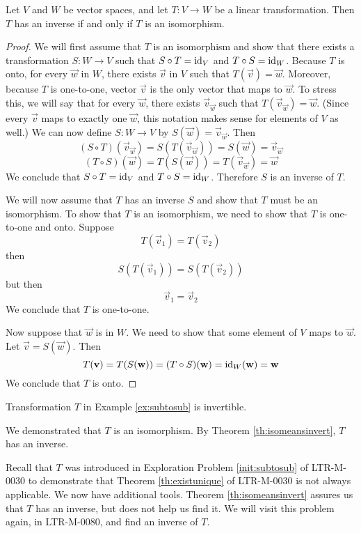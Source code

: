 \documentclass{ximera}
\begin{document}
\begin{theorem}\label{th:isomeansinvert} Let $V$ and $W$ be vector spaces, and let $T:V\rightarrow W$ be a linear transformation.  Then $T$ has an inverse if and only if $T$ is an isomorphism. 
\end{theorem}
\begin{proof}
We will first assume that $T$ is an isomorphism and show that there exists a transformation $S:W\rightarrow V$ such that $S\circ T=\text{id}_V$ and $T\circ S=\text{id}_W$.  Because $T$ is onto, for every $\vec{w}$ in $W$, there exists $\vec{v}$ in $V$ such that $T(\vec{v})=\vec{w}$.  Moreover, because $T$ is one-to-one, vector $\vec{v}$ is the only vector that maps to $\vec{w}$.  To stress this, we will say that for every $\vec{w}$, there exists $\vec{v}_{\vec{w}}$ such that $T(\vec{v}_{\vec{w}})=\vec{w}$. (Since every $\vec{v}$ maps to exactly one $\vec{w}$, this notation makes sense for elements of $V$ as well.)  We can now define $S:W\rightarrow V$ by $S(\vec{w})=\vec{v}_{\vec{w}}$.
Then
$$(S\circ T)(\vec{v}_{\vec{w}})=S(T(\vec{v}_{\vec{w}}))=S(\vec{w})=\vec{v}_{\vec{w}}$$
$$(T\circ S)(\vec{w})=T(S(\vec{w}))=T(\vec{v}_{\vec{w}})=\vec{w}$$
We conclude that $S\circ T=\text{id}_V$ and $T\circ S=\text{id}_W$.  Therefore $S$ is an inverse of $T$.

We will now assume that $T$ has an inverse $S$ and show that $T$ must be an isomorphism.  To show that $T$ is an isomorphism, we need to show that $T$ is one-to-one and onto.
Suppose $$T(\vec{v}_1)=T(\vec{v}_2)$$ then $$S(T(\vec{v}_1))=S(T(\vec{v}_2))$$
but then
$$\vec{v}_1=\vec{v}_2$$
We conclude that $T$ is one-to-one.

Now suppose that $\vec{w}$ is in $W$.  We need to show that some element of $V$ maps to $\vec{w}$.  Let $\vec{v}=S(\vec{w})$.  Then
$$T({\bf v})=T(S({\bf w}))=(T\circ S)({\bf w})=\text{id}_W({\bf w})={\bf w}$$
We conclude that $T$ is onto.
\end{proof}

\begin{example}\label{ex:subtosubinvert}
Transformation $T$ in Example \ref{ex:subtosub} is invertible.
\begin{explanation}
We demonstrated that $T$ is an isomorphism.  By Theorem \ref{th:isomeansinvert}, $T$ has an inverse.  

Recall that $T$ was introduced in Exploration Problem \ref {init:subtosub} of LTR-M-0030 to demonstrate that Theorem \ref{th:existunique} of LTR-M-0030 is not always applicable.  We now have additional tools. Theorem \ref{th:isomeansinvert} assures us that $T$ has an inverse, but does not help us find it. We will visit this problem again, in LTR-M-0080, and find an inverse of $T$.
\end{explanation}
\end{example}
\end{document}
